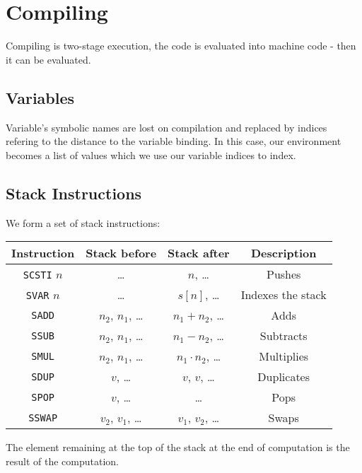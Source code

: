 \section{Compiling}

Compiling is two-stage execution, the code is evaluated
into machine code - then it can be evaluated.

\subsection{Variables}

Variable's symbolic names are lost on compilation and 
replaced by indices refering to the distance to the variable
binding. In this case, our environment becomes a list of values
which we use our variable indices to index.

\subsection{Stack Instructions}

We form a set of stack instructions:
\begin{center}
    \begin{tabular}{| c | c | c | c |}
        \hline
        Instruction & Stack before & Stack after & Description \\
        \hline \hline
        \texttt{SCSTI} $n$ & \ldots               & $n$, \ldots             & Pushes \\
        \hline
        \texttt{SVAR} $n$  & \ldots               & $s[n]$, \ldots          & Indexes the stack \\
        \hline
        \texttt{SADD}      & $n_2$, $n_1$, \ldots & $n_1 + n_2$, \ldots     & Adds \\
        \hline
        \texttt{SSUB}      & $n_2$, $n_1$, \ldots & $n_1 - n_2$, \ldots     & Subtracts \\
        \hline
        \texttt{SMUL}      & $n_2$, $n_1$, \ldots & $n_1 \cdot n_2$, \ldots & Multiplies \\
        \hline
        \texttt{SDUP}      & $v$, \ldots          & $v$, $v$, \ldots        & Duplicates \\
        \hline
        \texttt{SPOP}      & $v$, \ldots          & \ldots                  & Pops \\
        \hline
        \texttt{SSWAP}     & $v_2$, $v_1$, \ldots & $v_1$, $v_2$, \ldots    & Swaps \\
        \hline
    \end{tabular}
\end{center} The element remaining at the top of the stack at
the end of computation is the result of the computation.

